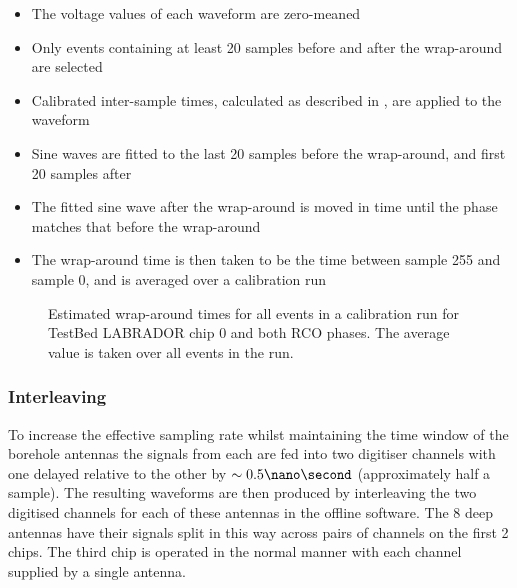 \begin{itemize}
\item The voltage values of each waveform are zero-meaned
\item Only events containing at least 20 samples before and after the wrap-around are selected
\item Calibrated inter-sample times, calculated as described in , are applied to the waveform 
\item Sine waves are fitted to the last 20 samples before the wrap-around, and first 20 samples after
\item The fitted sine wave after the wrap-around is moved in time until the phase matches that before the wrap-around
\item The wrap-around time is then taken to be the time between sample 255 and sample 0, and is averaged over a calibration run
\end{itemize}


\begin{figure}[htpb]
  \hfill
  \caption{Estimated wrap-around times for all events in a calibration run for TestBed LABRADOR chip 0 and both RCO phases. The average value is taken over all events in the run.}
  \label{fig:calibration:LABRADOR-Digitiser-Chip:Wrap-around}
\end{figure}


\subsubsection{Interleaving}
\label{sec:calibration:LABRADOR-Digitiser-Chip:Interleaving}

To increase the effective sampling rate whilst maintaining the time window of the borehole antennas the signals from each are fed into two digitiser channels with one delayed relative to the other by $\sim 0.5 \nano \second$ (approximately half a sample). The resulting waveforms are then produced by interleaving the two digitised channels for each of these antennas in the offline software. The 8 deep antennas have their signals split in this way across pairs of channels on the first 2 chips. The third chip is operated in the normal manner with each channel supplied by a single antenna.

